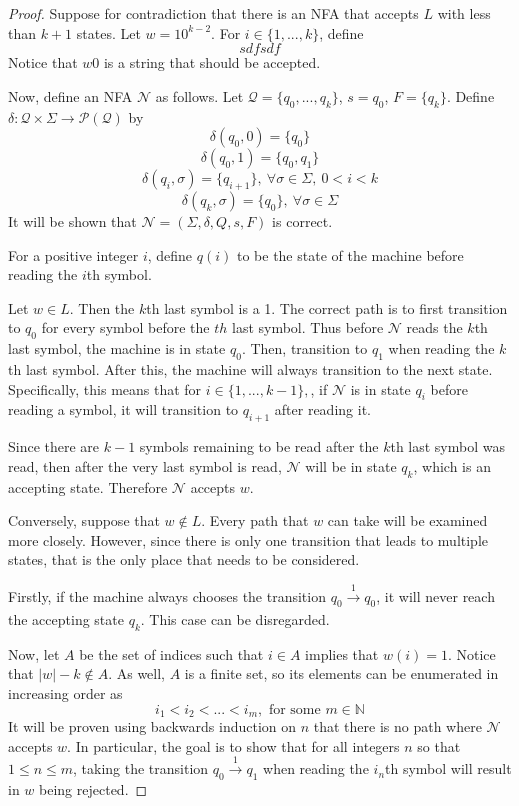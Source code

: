 \documentclass[11pt]{article}
\begin{document}
\begin{enumerate}[label=\textbf{Q\arabic*.}]
\begin{enumerate}[label=\textit{\alph*)}]
\begin{proof}
	Suppose for contradiction that there is an NFA that accepts \(L\) with less than \(k + 1\) states. Let \(w = 10^{k-2}\). For \(i \in \{1, ..., k\}\), define
	\[
		sdfsdf
	\]
	Notice that \(w0\) is a string that should be accepted.

	Now, define an NFA \(\mathcal{N}\) as follows. Let \(\mathcal{Q} = \{q_0, ..., q_k\}\), \(s = q_0\), \(F = \{q_k\}\). Define \(\delta : \mathcal{Q} \times \Sigma \to \mathcal{P} (\mathcal{Q})\) by
	\[
		\delta (q_0, 0) = \{ q_0 \} 
	\]
	\[
		\delta (q_0, 1) = \{ q_0,q_1 \} 
	\]
	\[
		\delta (q_i, \sigma ) = \{ q_{i+1} \} ,\ \forall \sigma \in \Sigma,\ 0 < i < k
	\]
	\[
		\delta (q_k, \sigma) = \{q_0\},\ \forall \sigma \in \Sigma 
	\]
	It will be shown that \(\mathcal{N} = (\Sigma , \delta , Q, s, F)\) is correct.

	For a positive integer \(i\), define \(q(i)\) to be the state of the machine before reading the \(i\)th symbol.

	Let \(w \in L\). Then the \(k\)th last symbol is a 1. The correct path is to first transition to \(q_0\) for every symbol before the \(th\) last symbol. Thus before \(\mathcal{N}\) reads the \(k\)th last symbol, the machine is in state \(q_0\). Then, transition to \(q_1\) when reading the \(k\)th last symbol. After this, the machine will always transition to the next state. Specifically, this means that for \(i \in \{1, ..., k-1 \},\), if \(\mathcal{N}\) is in state \(q_i\) before reading a symbol, it will transition to \(q_{i+1}\) after reading it.

	Since there are \(k-1\) symbols remaining to be read after the \(k\)th last symbol was read, then after the very last symbol is read, \(\mathcal{N}\) will be in state \(q_k\), which is an accepting state. Therefore \(\mathcal{N}\) accepts \(w\).

	Conversely, suppose that \(w \notin L\). Every path that \(w\) can take will be examined more closely. However, since there is only one transition that leads to multiple states, that is the only place that needs to be considered.

	Firstly, if the machine always chooses the transition \(q_0 \xrightarrow[]{1} q_0\), it will never reach the accepting state \(q_k\). This case can be disregarded.

	Now, let \(A\) be the set of indices such that \(i \in A\) implies that \(w(i) = 1\). Notice that \(|w| - k \notin A\). As well, \(A\) is a finite set, so its elements can be enumerated in increasing order as
	\[
		i_1 < i_2 < ... < i_m, \text{ for some } m \in \mathbb{N}
	\]
	It will be proven using backwards induction on \(n\) that there is no path where \(\mathcal{N}\) accepts \(w\). In particular, the goal is to show that for all integers \(n\) so that \(1 \leq n \leq m\), taking the transition \(q_0 \xrightarrow{1} q_1\) when reading the \(i_n\)th symbol will result in \(w\) being rejected.


\end{proof}
\end{enumerate}
\end{enumerate}
\end{document}
